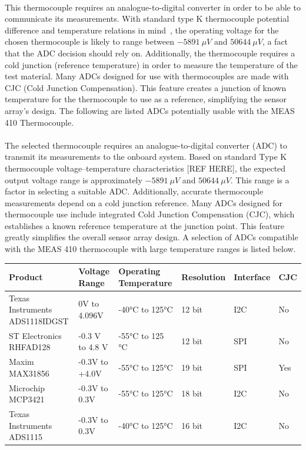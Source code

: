 \documentclass[11pt]{article}
\begin{document}
	\paragraph{}This thermocouple requires an analogue-to-digital converter in order to be able to communicate its measurements. With standard type K thermocouple potential difference and temperature relations in mind~\cite{ref}, the operating voltage for the chosen thermocouple is likely to range between \(-5891~\mu {V}\) and \(50644~\mu V\), a fact that the ADC decision should rely on. Additionally, the thermocouple requires a cold junction (reference temperature) in order to measure the temperature of the test material. Many ADCs designed for use with thermocouples are made with CJC (Cold Junction Compensation). This feature creates a junction of known temperature for the thermocouple to use as a reference, simplifying the sensor array's design. The following are listed ADCs potentially usable with the MEAS 410 Thermocouple.
	
	\paragraph{}The selected thermocouple requires an analogue-to-digital converter (ADC) to transmit its measurements to the onboard system. Based on standard Type K thermocouple voltage–temperature characteristics [REF HERE], the expected output voltage range is approximately \(-5891~\mu {V}\) and \(50644~\mu V\). This range is a factor in selecting a suitable ADC. Additionally, accurate thermocouple measurements depend on a cold junction reference. Many ADCs designed for thermocouple use include integrated Cold Junction Compensation (CJC), which establishes a known reference temperature at the junction point. This feature greatly simplifies the overall sensor array design. A selection of ADCs compatible with the MEAS 410 thermocouple with large temperature ranges is listed below.
	
	\begin{center}
		\begin{tabular}{|p{4cm}|p{2.5cm}|p{2.5cm}|p{2cm}|p{2cm}|p{1cm}|}
			\hline
			\bf{Product} & \bf{Voltage Range} & \bf{Operating Temperature} & \bf{Resolution} & \bf{Interface} & \bf{CJC} \\ \hline
			Texas Instruments ADS1118IDGST& 0V to 4.096V & -40°C to 125°C & 12 bit & I2C & No\\ \hline
			ST Electronics RHFAD128 & -0.3 V to 4.8 V & -55°C to 125 °C & 12 bit & SPI & No \\ \hline
			Maxim MAX31856 & -0.3V to +4.0V & -55°C to 125°C & 19 bit & SPI & Yes\\ \hline
			Microchip MCP3421& -0.3V to 0.3V & -55°C to 125°C & 18 bit & I2C & No\\ \hline
			Texas Instruments ADS1115 & -0.3V to 0.3V & -40°C to 125°C & 16 bit & I2C & No \\ \hline
		\end{tabular}
	\end{center}
	
\end{document}
